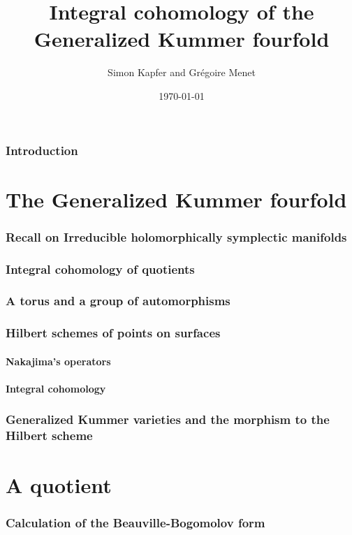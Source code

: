 \documentclass[a4paper]{article}
\begin{document}
\title{Integral cohomology of the Generalized Kummer fourfold}


\author{Simon Kapfer and Gr\'egoire Menet}


\date{\today}

\maketitle
\section{Introduction}
\part{The Generalized Kummer fourfold}
\section{Recall on Irreducible holomorphically symplectic manifolds}
\section{Integral cohomology of quotients}
\section{A torus and a group of automorphisms}
\section{Hilbert schemes of points on surfaces}
	\subsection{Nakajima's operators}
	\subsection{Integral cohomology}
\section{Generalized Kummer varieties and the morphism to the Hilbert scheme}


\part{A quotient}
\section{Calculation of the Beauville-Bogomolov form}


\end{document}

